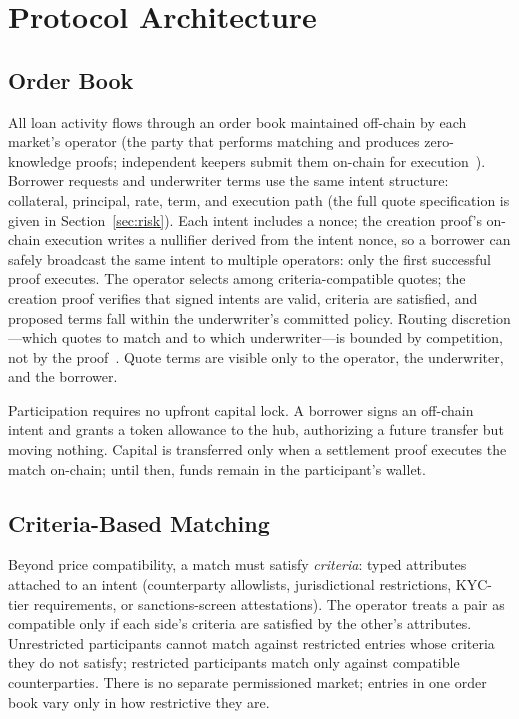 \section{Protocol Architecture}
\label{sec:architecture}

\subsection{Order Book}

All loan activity flows through an order book maintained off-chain by each market's operator (the party that performs matching and produces zero-knowledge proofs; independent keepers submit them on-chain for execution~\cite{daloc-decent2026}). Borrower requests and underwriter terms use the same intent structure: collateral, principal, rate, term, and execution path (the full quote specification is given in Section~\ref{sec:risk}). Each intent includes a nonce; the creation proof's on-chain execution writes a nullifier derived from the intent nonce, so a borrower can safely broadcast the same intent to multiple operators: only the first successful proof executes. The operator selects among criteria-compatible quotes; the creation proof verifies that signed intents are valid, criteria are satisfied, and proposed terms fall within the underwriter's committed policy. Routing discretion---which quotes to match and to which underwriter---is bounded by competition, not by the proof~\cite{daloc-decent2026}. Quote terms are visible only to the operator, the underwriter, and the borrower.

Participation requires no upfront capital lock. A borrower signs an off-chain intent and grants a token allowance to the hub, authorizing a future transfer but moving nothing. Capital is transferred only when a settlement proof executes the match on-chain; until then, funds remain in the participant's wallet.

\subsection{Criteria-Based Matching}

Beyond price compatibility, a match must satisfy \emph{criteria}: typed attributes attached to an intent (counterparty allowlists, jurisdictional restrictions, KYC-tier requirements, or sanctions-screen attestations). The operator treats a pair as compatible only if each side's criteria are satisfied by the other's attributes. Unrestricted participants cannot match against restricted entries whose criteria they do not satisfy; restricted participants match only against compatible counterparties. There is no separate permissioned market; entries in one order book vary only in how restrictive they are.

